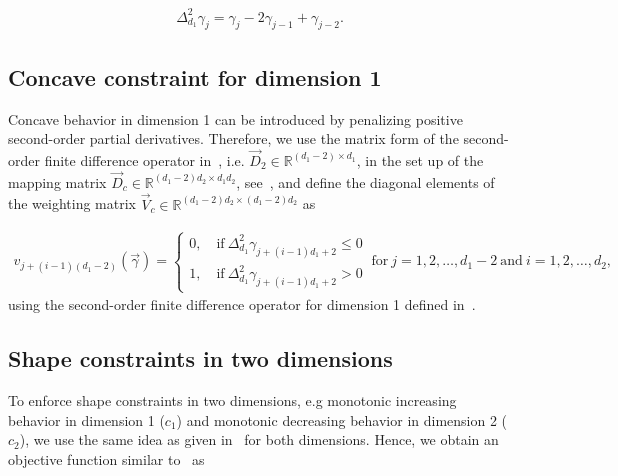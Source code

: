 \begin{align} \label{eq:FD-operator2-dim1}
	\Delta^2_{d_1} \gamma_j = \gamma_j - 2\gamma_{j-1} + \gamma_{j-2}.
\end{align}


\subsection{Concave constraint for dimension 1} \label{subsec:CONC-TP-one-dim}

Concave behavior in dimension 1 can be introduced by penalizing positive second-order partial derivatives. Therefore, we  use the matrix form of the second-order finite difference operator in~, i.e. $\vec{D}_2 \in \mathbb{R}^{(d_1-2) \times d_1}$, in the set up of the mapping matrix $\vec{D}_c \in \mathbb{R}^{(d_1-2)d_2 \times d_1d_2}$, see~, and define the diagonal elements of the weighting matrix $\vec{V}_c \in \mathbb{R}^{(d_1-2)d_2 \times (d_1-2)d_2}$ as

\begin{align} \label{}
	v_{j+(i-1)(d_1-2)}(\vec{\gamma}) = \begin{cases}
		0, \quad \text{if} \ \Delta^2_{d_1} \gamma_{j+(i-1)d_1+2} \le 0 \\ 
		1, \quad \text{if} \ \Delta^2_{d_1} \gamma_{j+(i-1)d_1+2} > 0
	\end{cases}	\ \text{for} \ j=1,2,\dots,d_1-2 \ \text{and} \ i=1,2,\dots,d_2,
\end{align}
%
using the second-order finite difference operator for dimension 1 defined in~.

\subsection{Shape constraints in two dimensions} \label{subsec:MULTICON-TP-one-dim}

To enforce shape constraints in two dimensions, e.g monotonic increasing behavior in dimension 1 ($c_1$) and monotonic decreasing behavior in dimension 2 ($c_2$), we use the same idea as given in~ for both dimensions. Hence, we obtain an objective function similar to~ as


